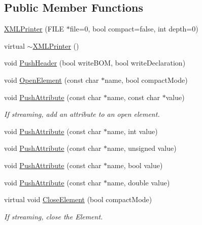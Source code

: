 \subsection*{Public Member Functions}
\begin{DoxyCompactItemize}
\item 
\hyperlink{classtinyxml2_1_1_x_m_l_printer_aa6d3841c069085f5b8a27bc7103c04f7}{X\-M\-L\-Printer} (F\-I\-L\-E $\ast$file=0, bool compact=false, int depth=0)
\item 
virtual \hyperlink{classtinyxml2_1_1_x_m_l_printer_af4caefa48ea6436898fb1807de8d14c0}{$\sim$\-X\-M\-L\-Printer} ()
\item 
void \hyperlink{classtinyxml2_1_1_x_m_l_printer_a178c608ce8476043d5d6513819cde903}{Push\-Header} (bool write\-B\-O\-M, bool write\-Declaration)
\item 
void \hyperlink{classtinyxml2_1_1_x_m_l_printer_a5f397c5502c545c65fe9a8f46f4acebd}{Open\-Element} (const char $\ast$name, bool compact\-Mode)
\item 
void \hyperlink{classtinyxml2_1_1_x_m_l_printer_a9a4e2c9348b42e147629d5a99f4af3f0}{Push\-Attribute} (const char $\ast$name, const char $\ast$value)
\begin{DoxyCompactList}\small\item\em If streaming, add an attribute to an open element. \end{DoxyCompactList}\item 
void \hyperlink{classtinyxml2_1_1_x_m_l_printer_a69120c82088597372d28d0a98f2ee7a1}{Push\-Attribute} (const char $\ast$name, int value)
\item 
void \hyperlink{classtinyxml2_1_1_x_m_l_printer_aa41039e51990aaf5342f3e0575a692c4}{Push\-Attribute} (const char $\ast$name, unsigned value)
\item 
void \hyperlink{classtinyxml2_1_1_x_m_l_printer_a51f7950d7b7a19f0d3a0d549a318d45f}{Push\-Attribute} (const char $\ast$name, bool value)
\item 
void \hyperlink{classtinyxml2_1_1_x_m_l_printer_a1714867af40e68ca404c3e84b6cac2a6}{Push\-Attribute} (const char $\ast$name, double value)
\item 
virtual void \hyperlink{classtinyxml2_1_1_x_m_l_printer_adb8e885f55212bf36e9c602211e3068c}{Close\-Element} (bool compact\-Mode)
\begin{DoxyCompactList}\small\item\em If streaming, close the Element. \end{DoxyCompactList}\item 

\end{DoxyCompactItemize}
